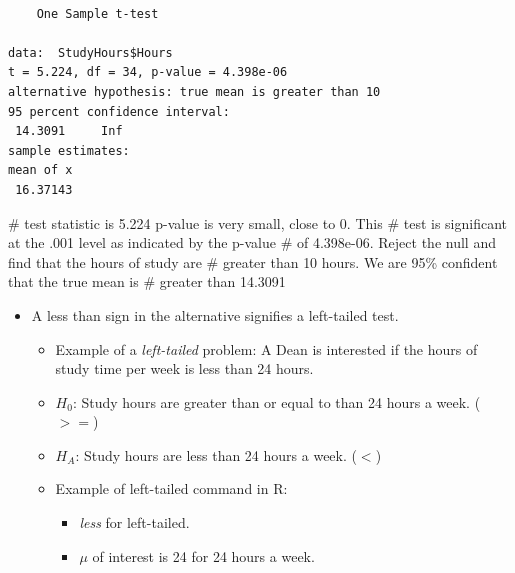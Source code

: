 \documentclass[
  letterpaper,
  DIV=11,
  numbers=noendperiod]{scrreprt}
\newenvironment{Shaded}{\begin{snugshade}}{\end{snugshade}}
\newcommand{\AttributeTok}[1]{\textcolor[rgb]{0.40,0.45,0.13}{#1}}
\newcommand{\CommentTok}[1]{\textcolor[rgb]{0.37,0.37,0.37}{#1}}
\newcommand{\DecValTok}[1]{\textcolor[rgb]{0.68,0.00,0.00}{#1}}
\newcommand{\FunctionTok}[1]{\textcolor[rgb]{0.28,0.35,0.67}{#1}}
\newcommand{\NormalTok}[1]{\textcolor[rgb]{0.00,0.23,0.31}{#1}}
\newcommand{\OtherTok}[1]{\textcolor[rgb]{0.00,0.23,0.31}{#1}}
\newcommand{\SpecialCharTok}[1]{\textcolor[rgb]{0.37,0.37,0.37}{#1}}
\newcommand{\StringTok}[1]{\textcolor[rgb]{0.13,0.47,0.30}{#1}}
\providecommand{\tightlist}{%
  \setlength{\itemsep}{0pt}\setlength{\parskip}{0pt}}\usepackage{longtable,booktabs,array}
\begin{document}
\begin{verbatim}

    One Sample t-test

data:  StudyHours$Hours
t = 5.224, df = 34, p-value = 4.398e-06
alternative hypothesis: true mean is greater than 10
95 percent confidence interval:
 14.3091     Inf
sample estimates:
mean of x 
 16.37143 
\end{verbatim}

\begin{Shaded}
\begin{Highlighting}[]
\CommentTok{\# test statistic is 5.224 p{-}value is very small, close to 0. This}
\CommentTok{\# test is significant at the .001 level as indicated by the p{-}value}
\CommentTok{\# of 4.398e{-}06.  Reject the null and find that the hours of study are}
\CommentTok{\# greater than 10 hours.  We are 95\% confident that the true mean is}
\CommentTok{\# greater than 14.3091}
\end{Highlighting}
\end{Shaded}

\begin{itemize}
\item
  A less than sign in the alternative signifies a left-tailed test.

  \begin{itemize}
  \item
    Example of a \emph{left-tailed} problem: A Dean is interested if the
    hours of study time per week is less than 24 hours.
  \item
    \(H_0\): Study hours are greater than or equal to than 24 hours a
    week. (\(>=\))
  \item
    \(H_A\): Study hours are less than 24 hours a week. (\(<\))
  \item
    Example of left-tailed command in R:

    \begin{itemize}
    \tightlist
    \item
      \emph{less} for left-tailed.
    \item
      \(\mu\) of interest is 24 for 24 hours a week.
    \end{itemize}
  \end{itemize}
\end{itemize}

\begin{Shaded}
\end{Shaded}
\end{document}
